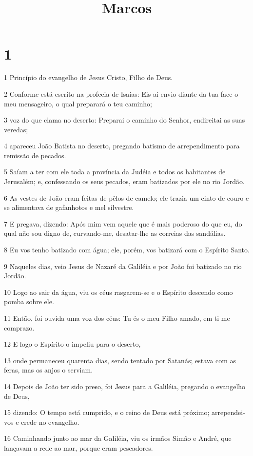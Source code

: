 

\title{Marcos}


\chapter{1}

\par 1 Princípio do evangelho de Jesus Cristo, Filho de Deus.
\par 2 Conforme está escrito na profecia de Isaías: Eis aí envio diante da tua face o meu mensageiro, o qual preparará o teu caminho;
\par 3 voz do que clama no deserto: Preparai o caminho do Senhor, endireitai as suas veredas;
\par 4 apareceu João Batista no deserto, pregando batismo de arrependimento para remissão de pecados.
\par 5 Saíam a ter com ele toda a província da Judéia e todos os habitantes de Jerusalém; e, confessando os seus pecados, eram batizados por ele no rio Jordão.
\par 6 As vestes de João eram feitas de pêlos de camelo; ele trazia um cinto de couro e se alimentava de gafanhotos e mel silvestre.
\par 7 E pregava, dizendo: Após mim vem aquele que é mais poderoso do que eu, do qual não sou digno de, curvando-me, desatar-lhe as correias das sandálias.
\par 8 Eu vos tenho batizado com água; ele, porém, vos batizará com o Espírito Santo.
\par 9 Naqueles dias, veio Jesus de Nazaré da Galiléia e por João foi batizado no rio Jordão.
\par 10 Logo ao sair da água, viu os céus rasgarem-se e o Espírito descendo como pomba sobre ele.
\par 11 Então, foi ouvida uma voz dos céus: Tu és o meu Filho amado, em ti me comprazo.
\par 12 E logo o Espírito o impeliu para o deserto,
\par 13 onde permaneceu quarenta dias, sendo tentado por Satanás; estava com as feras, mas os anjos o serviam.
\par 14 Depois de João ter sido preso, foi Jesus para a Galiléia, pregando o evangelho de Deus,
\par 15 dizendo: O tempo está cumprido, e o reino de Deus está próximo; arrependei-vos e crede no evangelho.
\par 16 Caminhando junto ao mar da Galiléia, viu os irmãos Simão e André, que lançavam a rede ao mar, porque eram pescadores.
